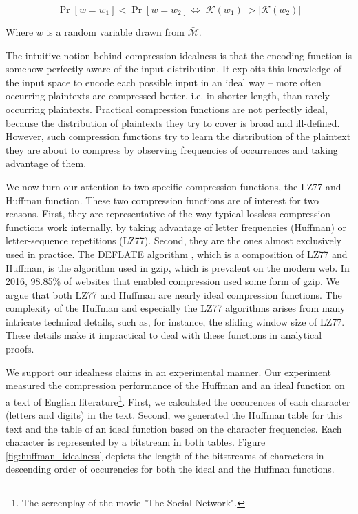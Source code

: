 \begin{equation*}
\Pr[w = w_1] < \Pr[w = w_2] \iff \lvert\mathcal{K}(w_1)\rvert > \lvert\mathcal{K}(w_2)\rvert
\end{equation*}

Where $w$ is a random variable drawn from $\bar{\mathcal{M}}$.

The intuitive notion behind compression idealness is that the encoding
function is somehow perfectly aware of the input distribution. It
exploits this knowledge of the input space to encode each possible
input in an ideal way – more often occurring plaintexts are compressed
better, i.e. in shorter length, than rarely occurring plaintexts.
Practical compression functions are not perfectly ideal, because the
distribution of plaintexts they try to cover is broad and ill-defined.
However, such compression functions try to learn the distribution of
the plaintext they are about to compress by observing frequencies of
occurrences and taking advantage of them.

We now turn our attention to two specific compression functions, the
LZ77 and Huffman function. These two compression functions are of
interest for two reasons. First, they are representative of the way
typical lossless compression functions work internally, by taking
advantage of letter frequencies (Huffman) or letter-sequence
repetitions (LZ77). Second, they are the ones almost exclusively used in
practice. The DEFLATE algorithm \cite{deutsch1996deflate}, which is a composition of LZ77 and
Huffman, is the algorithm used in gzip, which is prevalent on the
modern web. In 2016, 98.85\% of websites that enabled compression used
some form of gzip. We argue that both LZ77 and Huffman are nearly
ideal compression functions. The complexity of the Huffman and
especially the LZ77 algorithms arises from many intricate technical
details, such as, for instance, the sliding window size of LZ77. These
details make it impractical to deal with these functions in analytical
proofs.

We support our idealness claims in an experimental manner. Our experiment
measured the compression performance of the Huffman and an ideal function on a
text of English literature\footnote{The screenplay of the movie "The Social
Network".}. First, we calculated the occurences of each character (letters and
digits) in the text. Second, we generated the Huffman
table for this text and the table of an ideal function based on the character
frequencies. Each character is represented by a bitstream in both tables. Figure
\ref{fig:huffman_idealness} depicts the length of the bitstreams of characters
in descending order of occurencies for both the ideal and the Huffman functions.

